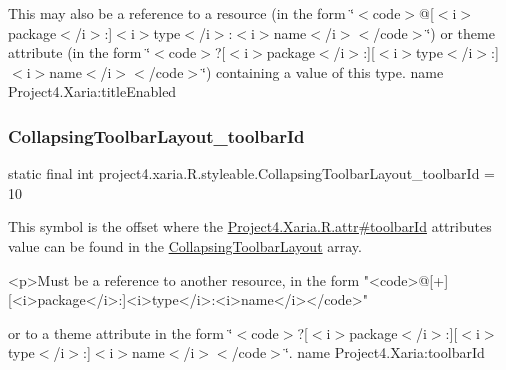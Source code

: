 This may also be a reference to a resource (in the form \char`\"{}$<$code$>$@\mbox{[}$<$i$>$package$<$/i$>$\+:\mbox{]}$<$i$>$type$<$/i$>$\+:$<$i$>$name$<$/i$>$$<$/code$>$\char`\"{}) or theme attribute (in the form \char`\"{}$<$code$>$?\mbox{[}$<$i$>$package$<$/i$>$\+:\mbox{]}\mbox{[}$<$i$>$type$<$/i$>$\+:\mbox{]}$<$i$>$name$<$/i$>$$<$/code$>$\char`\"{}) containing a value of this type.  name Project4.\+Xaria\+:title\+Enabled \mbox{\label{classproject4_1_1xaria_1_1R_1_1styleable_a0a1865ab13f923df3c8b09029e0f7e01}} 
\subsubsection{\texorpdfstring{Collapsing\+Toolbar\+Layout\+\_\+toolbar\+Id}{CollapsingToolbarLayout\_toolbarId}}
{\footnotesize\ttfamily static final int project4.\+xaria.\+R.\+styleable.\+Collapsing\+Toolbar\+Layout\+\_\+toolbar\+Id = 10\hspace{0.3cm}{\ttfamily [static]}}

This symbol is the offset where the \hyperlink{}{Project4.\+Xaria.\+R.\+attr\#toolbar\+Id} attribute\textquotesingle{}s value can be found in the \hyperlink{classproject4_1_1xaria_1_1R_1_1styleable_ac131ed2b7e0e7f05b58231242478b839}{Collapsing\+Toolbar\+Layout} array.

\begin{DoxyVerb}      <p>Must be a reference to another resource, in the form "<code>@[+][<i>package</i>:]<i>type</i>:<i>name</i></code>"
\end{DoxyVerb}
 or to a theme attribute in the form \char`\"{}$<$code$>$?\mbox{[}$<$i$>$package$<$/i$>$\+:\mbox{]}\mbox{[}$<$i$>$type$<$/i$>$\+:\mbox{]}$<$i$>$name$<$/i$>$$<$/code$>$\char`\"{}.  name Project4.\+Xaria\+:toolbar\+Id \mbox{\label{classproject4_1_1xaria_1_1R_1_1styleable_a1f5b5d01ec9bc3843c12d8e55c052342}} 
